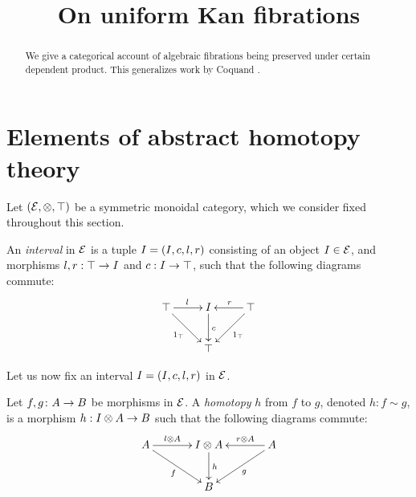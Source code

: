 \documentclass[reqno,10pt,a4paper,oneside]{amsart}
\title{On uniform Kan fibrations}
\begin{document}
\begin{abstract}
We give a categorical account of algebraic fibrations being preserved under certain dependent product.
This generalizes work by Coquand \etal.
\end{abstract}

\maketitle

\tableofcontents


\section{Elements of abstract homotopy theory} 

Let $(\mathcal{E}, \otimes, \top)$ be a symmetric monoidal category, which we consider fixed throughout this section. 

\begin{definition} An \emph{interval} in $\mathcal{E}$ is a tuple $I = (I, c, l, r)$ consisting of  an object $I \in \mathcal{E}$, 
and morphisms $l, r : \top \to I$ and $c : I \to \top$,   such that the following diagrams commute:
\[
\xymatrix{
\unit \ar[r]^\intervall \ar[dr]_{1_\unit} & \interval \ar[d]^{c} & \unit \ar[dl]^{1_\unit} \ar[l]_{\intervalr}  \\
 & \unit & }
 \]
\end{definition}

Let us now fix an interval $I = (I, c, l, r)$ in $\mathcal{E}$. 



\begin{definition}
\label{def:homotopy}
Let $f, g \colon A \to B$ be morphisms in $\mathcal{E}$. A \emph{homotopy} $h$ from $f$ to $g$, denoted $h : f \sim g$, is a morphism $h : I \otimes A \to B$ such that the following diagrams commute:
\[
\xymatrix@C=1.2cm{
A \ar[r]^-{\intervall \otimes A} \ar[dr]_{f} & \interval \otimes A \ar[d]^{h} & A \ar[dl]^{g} \ar[l]_-{r \otimes A}  \\
 & B & }
 \]
\end{definition}
\end{document}
